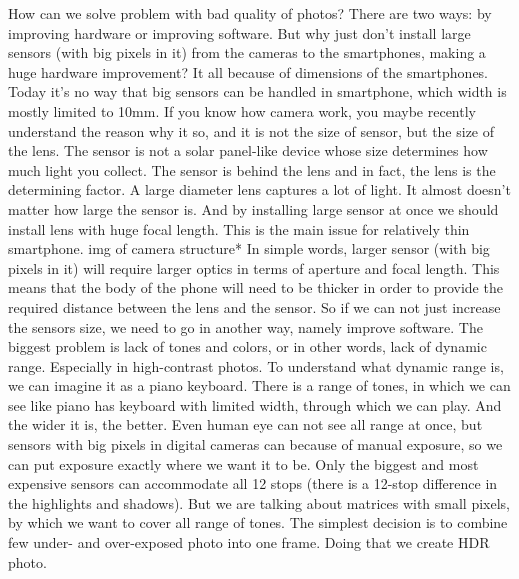 \documentclass[10pt,twoside,english,a4paper]{article}
\begin{document}
How can we solve problem with bad quality of photos? There are two ways:
by improving hardware or improving software. But why just don't install
large sensors (with big pixels in it) from the cameras to the smartphones,
making a huge hardware improvement?
\newline It all because of dimensions of the smartphones. Today it's no
way that big sensors can be handled in smartphone, which width is mostly
limited to  10mm. If you know how camera work, you maybe recently
understand the reason why it so, and it is not the size of sensor, but the
size of the lens. The sensor is not a solar panel-like device whose size
determines how much light you collect. The sensor is behind the lens
and in fact, the lens is the determining factor.
A large diameter lens captures a lot of light.
It almost doesn't matter how large the sensor is. And by installing large
sensor at once we should install lens with huge focal length. This is the
main issue for relatively thin smartphone.
\newline *img of camera structure*
\newline In simple words, larger sensor (with big pixels in it) will require
larger optics in terms of aperture and focal length.
This means that the body of the phone will need to be thicker in
order to provide the required distance between the lens and the sensor.
\newline
So if we can not just increase the sensors size, we need to go in another
way, namely improve software. The biggest problem is lack of tones and
colors, or in other words, lack  of dynamic range. Especially in
high-contrast photos.
To understand what dynamic range is, we can imagine it as a piano keyboard. There is
a range of tones, in which we can see like piano has keyboard with limited
width, through which we can play. And the wider
it is, the better. Even human eye can not see all range at once, but sensors
with big pixels in
digital cameras can because of manual exposure, so we can put exposure
exactly where we want it to be. Only the biggest and most expensive
sensors can accommodate all 12 stops (there is a 12-stop difference in the
highlights and shadows). But we are talking about matrices with small
pixels, by which we want to cover all range of tones.
\newline The simplest decision is to combine few under- and over-exposed
photo into one frame. Doing that we create HDR photo. \cite{HDR1}
\end{document}
